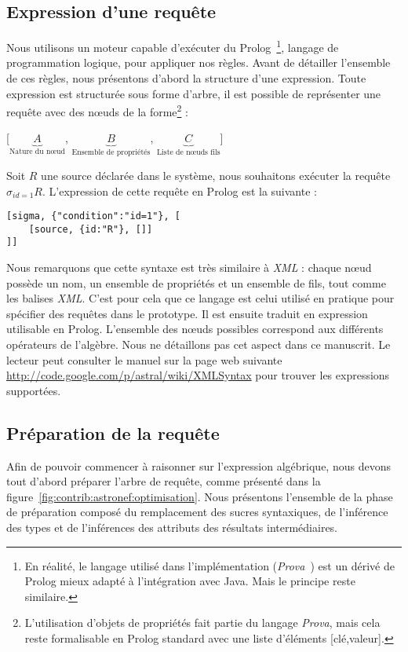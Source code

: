\subsection{Expression d'une requête}
Nous utilisons un moteur capable d'exécuter du Prolog~\footnote{En réalité, le langage utilisé dans l'implémentation (\textit{Prova}~\cite{Kozlenkov:prova}) est un dérivé de Prolog mieux adapté à l'intégration avec Java. Mais le principe reste similaire.}, langage de programmation logique, pour appliquer nos règles. Avant de détailler l'ensemble de ces règles, nous présentons d'abord la structure d'une expression. Toute expression est structurée sous forme d'arbre, il est possible de représenter une requête avec des nœuds de la forme\footnote{L'utilisation d'objets de propriétés fait partie du langage \textit{Prova}, mais cela reste formalisable en Prolog standard avec une liste d'éléments [clé,valeur].} :
\begin{center} [$\underbrace{A}_{\textrm{Nature du nœud}}$, $\underbrace{B}_{\textrm{Ensemble de propriétés}}$, $\underbrace{C}_{\textrm{Liste de nœuds fils}}$] \end{center}
\begin{example}
	Soit $R$ une source déclarée dans le système, nous souhaitons exécuter la requête $\sigma_{id=1} R$. L'expression de cette requête en Prolog est la suivante :
	\begin{lstlisting}
[sigma,	{"condition":"id=1"}, [
	[source, {id:"R"}, []]
]]
	\end{lstlisting}
\end{example}
Nous remarquons que cette syntaxe est très similaire à \textit{XML} : chaque nœud possède un nom, un ensemble de propriétés et un ensemble de fils, tout comme les balises \textit{XML}. C'est pour cela que ce langage est celui utilisé en pratique pour spécifier des requêtes dans le prototype. Il est ensuite traduit en expression utilisable en Prolog. L'ensemble des nœuds possibles correspond aux différents opérateurs de l'algèbre. Nous ne détaillons pas cet aspect dans ce manuscrit. Le lecteur peut consulter le manuel sur la page web suivante \url{http://code.google.com/p/astral/wiki/XMLSyntax} pour trouver les expressions supportées.

\subsection{Préparation de la requête}
Afin de pouvoir commencer à raisonner sur l'expression algébrique, nous devons tout d'abord préparer l'arbre de requête, comme présenté dans la figure~\ref{fig:contrib:astronef:optimisation}. Nous présentons l'ensemble de la phase de préparation composé du remplacement des sucres syntaxiques, de l'inférence des types et de l'inférences des attributs des résultats intermédiaires.
